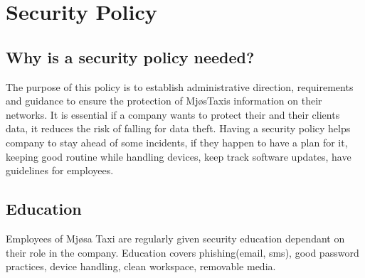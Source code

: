 \chapter{Security Policy}
\label{chap:securityPolicy}

\section{Why is a security policy needed?} %

The purpose of this policy is to establish administrative direction, requirements and guidance to ensure the protection of MjøsTaxis information on their networks.
It is essential if a company wants to protect their and their clients data, it reduces the risk of falling for data theft.
Having a security policy helps company to stay ahead of some incidents, if they happen to have a plan for it, keeping good routine while handling devices, keep track software updates, have guidelines for employees.

\section{Education}
Employees of Mjøsa Taxi are regularly given security education dependant on their role in the company.
Education covers phishing(email, sms), good password practices, device handling, clean workspace, removable media.


